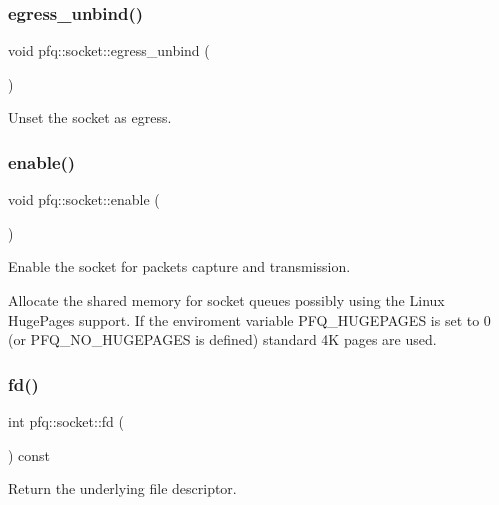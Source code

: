 \subsubsection{\texorpdfstring{egress\+\_\+unbind()}{egress\_unbind()}}
{\footnotesize\ttfamily void pfq\+::socket\+::egress\+\_\+unbind (\begin{DoxyParamCaption}{ }\end{DoxyParamCaption})\hspace{0.3cm}{\ttfamily [inline]}}



Unset the socket as egress. 

\mbox{\label{classpfq_1_1socket_a5b25af762946405695f4192b08c04146}} 
\subsubsection{\texorpdfstring{enable()}{enable()}}
{\footnotesize\ttfamily void pfq\+::socket\+::enable (\begin{DoxyParamCaption}{ }\end{DoxyParamCaption})\hspace{0.3cm}{\ttfamily [inline]}}



Enable the socket for packets capture and transmission. 

Allocate the shared memory for socket queues possibly using the Linux Huge\+Pages support. If the enviroment variable P\+F\+Q\+\_\+\+H\+U\+G\+E\+P\+A\+G\+ES is set to 0 (or P\+F\+Q\+\_\+\+N\+O\+\_\+\+H\+U\+G\+E\+P\+A\+G\+ES is defined) standard 4K pages are used. \mbox{\label{classpfq_1_1socket_a159189ab268469b3a6c438747a5bbb8c}} 
\subsubsection{\texorpdfstring{fd()}{fd()}}
{\footnotesize\ttfamily int pfq\+::socket\+::fd (\begin{DoxyParamCaption}{ }\end{DoxyParamCaption}) const\hspace{0.3cm}{\ttfamily [inline]}}



Return the underlying file descriptor. 

